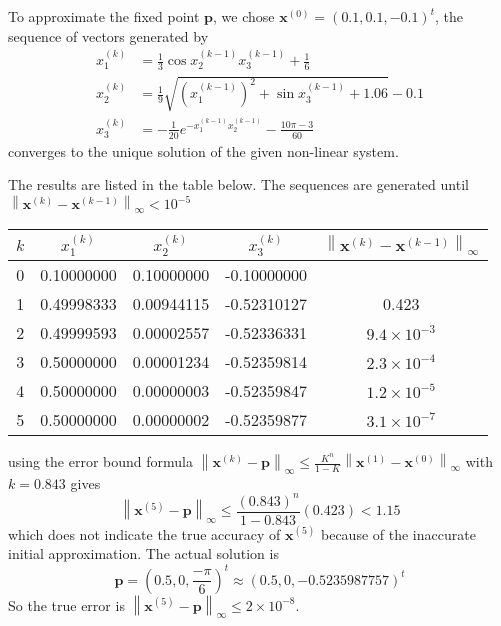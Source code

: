 \documentclass[../main-sheet.tex]{subfiles}
\begin{document}
\begin{ex}
    To approximate the fixed point \(\mathbf{p}\), we chose \(\mathbf{x}^{(0)}=(0.1,0.1,-0.1)^t\), the sequence of vectors generated by
    \begin{align*}
        x_1^{(k)} &= \frac{1}{3}\cos x_2^{(k-1)}x_3^{(k-1)}+\frac{1}{6}\\
        x_2^{(k)} &= \frac{1}{9}\sqrt{\left(x_1^{(k-1)}\right)^2+\sin x_3^{(k-1)}+1.06}-0.1\\
        x_3^{(k)} &= -\frac{1}{20}e^{-x_1^{(k-1)} x_2^{(k-1)}}-\frac{10\pi -3}{60}
    \end{align*}
    converges to the unique solution of the given non-linear system.

    The results are listed in the table below. The sequences are generated until \(\left\|\mathbf{x}^{(k)}-\mathbf{x}^{(k-1)}\right\|_\infty<10^{-5}\)
    \begin{table}[H]
        \centering
        \begin{tabular}{clllc}
            \toprule
            \(k\) & \multicolumn{1}{c}{\(x_1^{(k)}\)} & \multicolumn{1}{c}{\(x_2^{(k)}\)} & \multicolumn{1}{c}{\(x_3^{(k)}\)} & \(\left\|\mathbf{x}^{(k)}-\mathbf{x}^{(k-1)}\right\|_\infty\)\\\midrule
            0 & 0.10000000 & 0.10000000 & -0.10000000 & \\
            1 & 0.49998333 & 0.00944115 & -0.52310127 & 0.423 \\
            2 & 0.49999593 & 0.00002557 & -0.52336331 & \(9.4\times 10^{-3}\) \\
            3 & 0.50000000 & 0.00001234 & -0.52359814 & \(2.3\times 10^{-4}\) \\
            4 & 0.50000000 & 0.00000003 & -0.52359847 & \(1.2\times 10^{-5}\) \\
            5 & 0.50000000 & 0.00000002 & -0.52359877 & \(3.1\times 10^{-7}\) \\
            \bottomrule
        \end{tabular}
    \end{table}
    using the error bound formula 
    \(
        \left\|\mathbf{x}^{(k)}-\mathbf{p}\right\|_\infty\leq\frac{K^n}{1-K}\left\|\mathbf{x}^{(1)}-\mathbf{x}^{(0)}\right\|_\infty
    \) with \(k=0.843\) gives 
    \[
        \left\|\mathbf{x}^{(5)}-\mathbf{p}\right\|_\infty\leq\frac{(0.843)^n}{1-0.843}(0.423)<1.15
    \]
    which does not indicate the true accuracy of \(\mathbf{x}^{(5)}\) because of the inaccurate initial approximation. The actual solution is
    \[
        \mathbf{p}=\left( 0.5,0,\frac{-\pi}{6} \right)^t\approx \left( 0.5,0,-0.5235987757\right)^t
    \]
    So the true error is \(\left\|\mathbf{x}^{(5)}-\mathbf{p}\right\|_\infty\leq2\times 10^{-8}\).\\



\end{ex}
\end{document}
